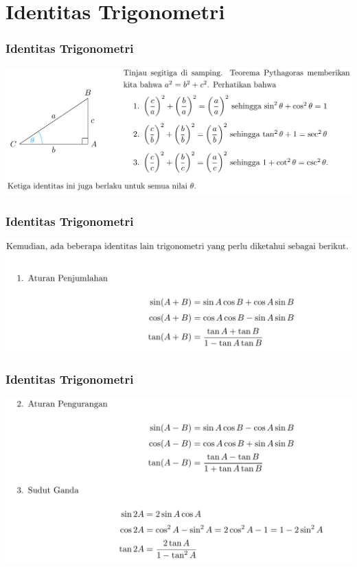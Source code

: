 \documentclass[pdflatex,compress,mathserif]{beamer}
\begin{document}
\section{Identitas Trigonometri}

\begin{frame}
	\frametitle{Identitas Trigonometri}
	\begin{center}
		\includegraphics[width=\linewidth]{img/img09}
	\end{center}
\end{frame}

\begin{frame}
	\frametitle{Identitas Trigonometri}
	\begin{center}
		\includegraphics[width=\linewidth]{img/img10}
	\end{center}
\end{frame}

\begin{frame}
	\frametitle{Identitas Trigonometri}
	\begin{center}
		\includegraphics[width=\linewidth]{img/img11}
	\end{center}
\end{frame}
\end{document}

